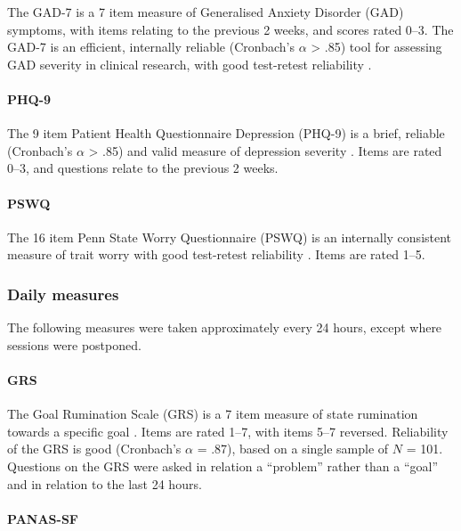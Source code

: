 \documentclass[man,floatsintext,a4paper,biblatex]{apa6}\usepackage[]{graphicx}\usepackage[]{color}
\begin{document}
The GAD-7 is a 7 item measure of Generalised Anxiety Disorder (GAD)
symptoms, with items relating to the previous 2 weeks, and scores rated
0--3. The GAD-7 is an efficient, internally reliable (Cronbach's $\alpha$
> .85) tool for assessing GAD severity in clinical research, with good
test-retest reliability \parencite{spitzerrl_brief_2006}.

\paragraph{PHQ-9}

The 9 item Patient Health Questionnaire Depression (PHQ-9) is a brief,
reliable (Cronbach's $\alpha$ > .85) and valid measure of depression
severity \parencite{kroenke_phq9_2001}. Items are rated 0--3,
and questions relate to the previous 2 weeks.

\paragraph{PSWQ}

The 16 item Penn State Worry Questionnaire (PSWQ) is an internally
consistent measure of trait worry with good test-retest reliability
\parencite{meyer_development_1990}.  Items are rated 1--5.

\subsubsection{Daily measures}

The following measures were taken approximately every 24 hours, except
where sessions were postponed.

\paragraph{GRS}

The Goal Rumination Scale (GRS) is a 7 item measure of state rumination
towards a specific goal \parencite{schultheiss_role_2008}. Items
are rated 1--7, with items 5--7 reversed. Reliability of the GRS is
good (Cronbach's $\alpha$ = .87), based on a single sample of $N$ =
101. Questions on the GRS were asked in relation a ``problem'' rather
than a ``goal'' and in relation to the last 24 hours.

\paragraph{PANAS-SF}
\end{document}
